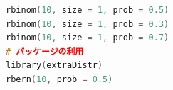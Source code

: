 \begin{lstlisting}[language=c++,label={code:17_02},caption={乱数のコードの例2}]
rbinom(10, size = 1, prob = 0.5)
rbinom(10, size = 1, prob = 0.3)
rbinom(10, size = 1, prob = 0.7)
# パッケージの利用
library(extraDistr)
rbern(10, prob = 0.5)
\end{lstlisting}
